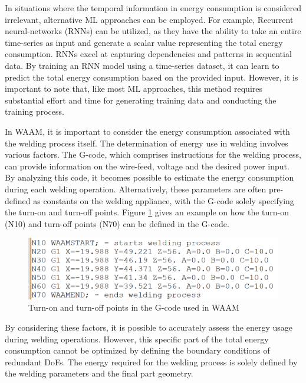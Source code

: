 In situations where the temporal information in energy consumption is considered irrelevant, alternative \acrshort{ML} approaches can be employed. For example, Recurrent neural-networks (\acrshort{RNN}s) can be utilized, as they have the ability to take an entire time-series as input and generate a scalar value representing the total energy consumption. \acrshort{RNN}s excel at capturing dependencies and patterns in sequential data. By training an \acrshort{RNN} model using a time-series dataset, it can learn to predict the total energy consumption based on the provided input. However, it is important to note that, like most \acrshort{ML} approaches, this method requires substantial effort and time for generating training data and conducting the training process.

In \acrshort{WAAM}, it is important to consider the energy consumption associated with the welding process itself. The determination of energy use in welding involves various factors. The G-code, which comprises instructions for the welding process, can provide information on the wire-feed, voltage and the desired power input. By analyzing this code, it becomes possible to estimate the energy consumption during each welding operation. Alternatively, these parameters are often pre-defined as constants on the welding appliance, with the G-code solely specifying the turn-on and turn-off points. Figure \ref{waamgcode} gives an example on how the turn-on (N10) and turn-off points (N70) can be defined in the G-code.
 
\begin{figure}[H]
	\centerline{\includegraphics[width=.75\textwidth]{figures/waamgcode.png}}
	\caption{Turn-on and turn-off points in the G-code used in WAAM}
	\label{waamgcode}
\end{figure}

By considering these factors, it is possible to accurately assess the energy usage during welding operations. However, this specific part of the total energy consumption cannot be optimized by defining the boundary conditions of redundant \acrshort{DoF}s. The energy required for the welding process is solely defined by the welding parameters and the final part geometry.

\newpage
